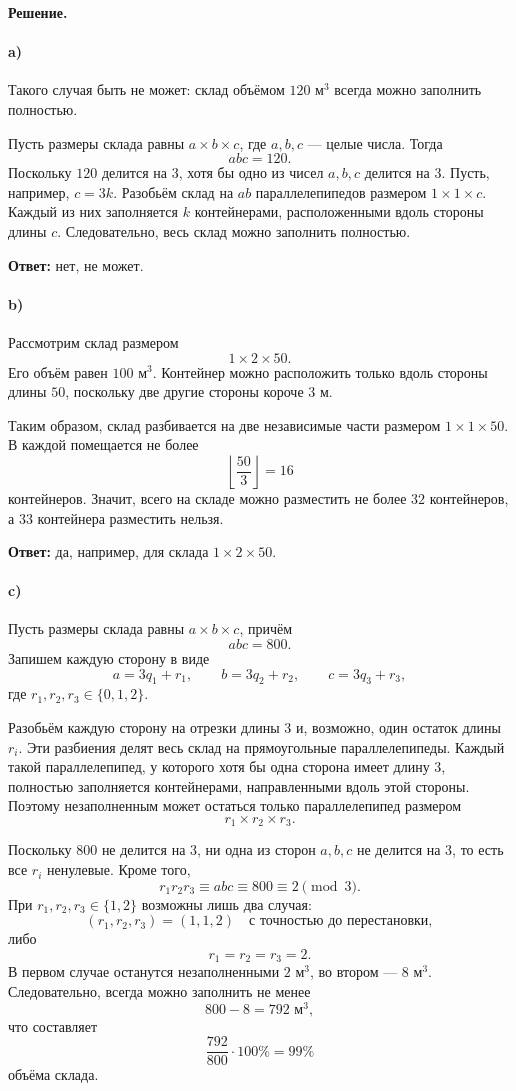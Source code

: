 \documentclass[12pt, a4paper]{article}
\begin{document}
\textbf{Решение.}

\paragraph{a)} Такого случая быть не может: склад объёмом $120\text{ м}^3$
всегда можно заполнить полностью.

Пусть размеры склада равны $a\times b\times c$, где $a,b,c$ --- целые
числа. Тогда
\[
abc=120.
\]
Поскольку $120$ делится на $3$, хотя бы одно из чисел $a,b,c$ делится на $3$.
Пусть, например, $c=3k$. Разобьём склад на $ab$ параллелепипедов размером
$1\times1\times c$. Каждый из них заполняется $k$ контейнерами,
расположенными вдоль стороны длины $c$. Следовательно, весь склад можно
заполнить полностью.

\textbf{Ответ:} нет, не может.

\paragraph{b)} Рассмотрим склад размером
\[
1\times2\times50.
\]
Его объём равен $100\text{ м}^3$. Контейнер можно расположить только вдоль
стороны длины $50$, поскольку две другие стороны короче $3$ м.

Таким образом, склад разбивается на две независимые части размером
$1\times1\times50$. В каждой помещается не более
\[
\left\lfloor\frac{50}{3}\right\rfloor=16
\]
контейнеров. Значит, всего на складе можно разместить не более $32$
контейнеров, а $33$ контейнера разместить нельзя.

\textbf{Ответ:} да, например, для склада $1\times2\times50$.

\paragraph{c)} Пусть размеры склада равны $a\times b\times c$, причём
\[
abc=800.
\]
Запишем каждую сторону в виде
\[
a=3q_1+r_1,\qquad b=3q_2+r_2,\qquad c=3q_3+r_3,
\]
где $r_1,r_2,r_3\in\{0,1,2\}$.

Разобьём каждую сторону на отрезки длины $3$ и, возможно, один остаток
длины $r_i$. Эти разбиения делят весь склад на прямоугольные
параллелепипеды. Каждый такой параллелепипед, у которого хотя бы одна
сторона имеет длину $3$, полностью заполняется контейнерами,
направленными вдоль этой стороны. Поэтому незаполненным может остаться
только параллелепипед размером
\[
r_1\times r_2\times r_3.
\]

Поскольку $800$ не делится на $3$, ни одна из сторон $a,b,c$ не делится
на $3$, то есть все $r_i$ ненулевые. Кроме того,
\[
r_1r_2r_3\equiv abc\equiv800\equiv2\pmod3.
\]
При $r_1,r_2,r_3\in\{1,2\}$ возможны лишь два случая:
\[
(r_1,r_2,r_3)=(1,1,2)
\quad\text{с точностью до перестановки},
\]
либо
\[
r_1=r_2=r_3=2.
\]
В первом случае останутся незаполненными $2\text{ м}^3$, во втором ---
$8\text{ м}^3$. Следовательно, всегда можно заполнить не менее
\[
800-8=792\text{ м}^3,
\]
что составляет
\[
\frac{792}{800}\cdot100\%=99\%
\]
объёма склада.
\end{document}
